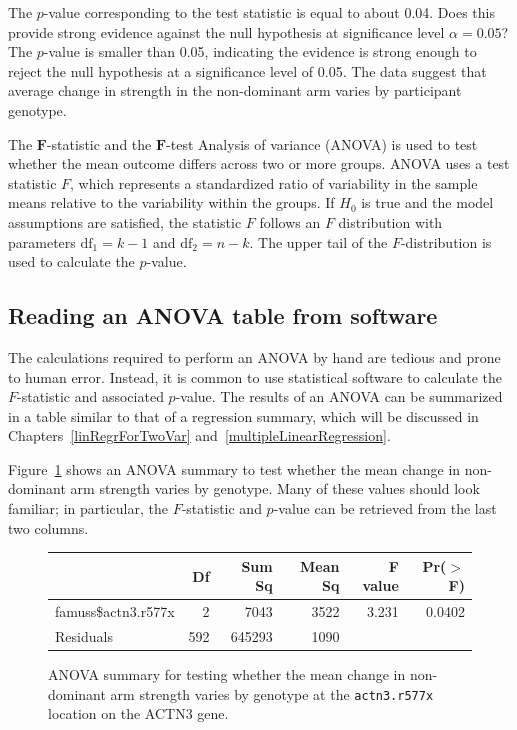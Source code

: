 \begin{examplewrap}
\begin{nexample}{The $p$-value corresponding to the test statistic is equal to about 0.04. Does this provide strong evidence against the null hypothesis at significance level $\alpha = 0.05$?}
The $p$-value is smaller than 0.05, indicating the evidence is strong enough to reject the null hypothesis at a significance level of 0.05. The data suggest that average change in strength in the non-dominant arm varies by participant genotype.	
\end{nexample}
\end{examplewrap}

\begin{onebox}{The $\pmb{F}$-statistic and the $\pmb{F}$-test}
		Analysis of variance (ANOVA) is used to test whether the mean outcome differs across two or more groups. ANOVA uses a test statistic $F$, which represents a standardized ratio of variability in the sample means relative to the variability within the groups. If $H_0$ is true and the model assumptions are satisfied, the statistic $F$ follows an $F$ distribution with parameters $\textrm{df}_{1}=k-1$ and $\textrm{df}_{2}=n-k$. The upper tail of the $F$-distribution is used to calculate the $p$-value.
\end{onebox}


\textD{\newpage}


\subsection{Reading an ANOVA table from software}

The calculations required to perform an ANOVA by hand are tedious and prone to human error. Instead, it is common to use statistical software to calculate the $F$-statistic and associated $p$-value. The results of an ANOVA can be summarized in a table similar to that of a regression summary, which will be discussed in Chapters~\ref{linRegrForTwoVar} and~\ref{multipleLinearRegression}.

Figure~\ref{anovaSummaryTableForFamuss} shows an ANOVA summary to test whether the mean change in non-dominant arm strength varies by genotype. Many of these values should look familiar; in particular, the $F$-statistic and $p$-value can be retrieved from the last two columns.
\textD{\vspace{5mm}}

\begin{figure}[ht]
	\centering
	\begin{tabular}{lrrrrr}
		\hline
		& Df & Sum Sq & Mean Sq & F value & Pr($>$F) \\ 
		\hline
		famuss\$actn3.r577x & 2 & 7043 & 3522 & 3.231 & 0.0402 \\ 
		Residuals & 592 & 645293 & 1090 &  &  \\    \hline
	\end{tabular}
	\caption{ANOVA summary for testing whether the mean change in non-dominant arm strength varies by genotype at the \texttt{actn3.r577x} location on the ACTN3 gene.}
	\label{anovaSummaryTableForFamuss}
\end{figure}


